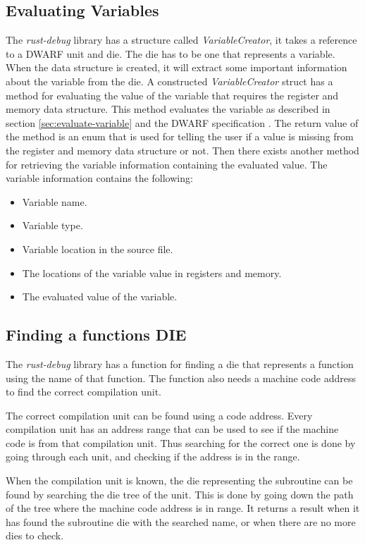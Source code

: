 \subsection{Evaluating Variables} \label{sec:ievalvar}
The \emph{rust-debug} library has a structure called \emph{VariableCreator}, it takes a reference to a \gls{DWARF} unit and \gls{die}.
The \gls{die} has to be one that represents a variable.
When the data structure is created, it will extract some important information about the variable from the \gls{die}. A constructed \emph{VariableCreator} struct has a method for evaluating the value of the variable that requires the register and memory data structure.
This method evaluates the variable as described in section \ref{sec:evaluate-variable} and the \gls{DWARF} specification \cite{dwarf}.
The return value of the method is an enum that is used for telling the user if a value is missing from the register and memory data structure or not.
Then there exists another method for retrieving the variable information containing the evaluated value.
The variable information contains the following:

\begin{itemize}
  \item Variable name.
  \item Variable type.
  \item Variable location in the source file.
  \item The locations of the variable value in registers and memory.
  \item The evaluated value of the variable.
\end{itemize}


\subsection{Finding a functions DIE} \label{sec:funcdie}
The \emph{rust-debug} library has a function for finding a \gls{die} that represents a function using the name of that function.
The function also needs a machine code address to find the correct compilation unit.


The correct compilation unit can be found using a code address.
Every compilation unit has an address range that can be used to see if the machine code is from that compilation unit.
Thus searching for the correct one is done by going through each unit, and checking if the address is in the range.


When the compilation unit is known, the \gls{die} representing the subroutine can be found by searching the \gls{die} tree of the unit.
This is done by going down the path of the tree where the machine code address is in range.
It returns a result when it has found the subroutine \gls{die} with the searched name, or when there are no more \glspl{die} to check.


